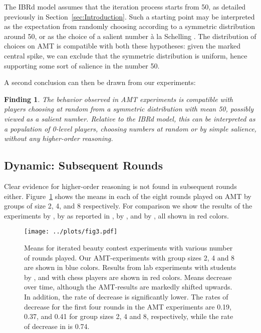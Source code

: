 \documentclass[12pt,review]{elsarticle}
\newtheorem{fdn}{Finding}
\begin{document}

The IBRd model assumes that the iteration process starts from 50,
as detailed previously in Section~\ref{sec:Introduction}. Such a
starting point may be interpreted as the expectation from randomly
choosing according to a symmetric distribution around 50, or as the
choice of a salient number \`{a} la Schelling \citep{sch60}. The
distribution of choices on AMT is compatible with both these hypotheses:
given the marked central spike, we can exclude that the symmetric
distribution is uniform, hence supporting some sort of salience in
the number 50. 

A second conclusion can then be drawn from our experiments: 

\begin{fdn}
The behavior observed in AMT experiments is compatible with players choosing at random from a symmetric distribution with mean 50, possibly viewed as a salient number. Relative to the IBRd model, this can be interpreted as a population of 0-level players, choosing numbers at random or by simple salience, without any higher-order reasoning.
\end{fdn}

\subsection{Dynamic: Subsequent Rounds\label{subsec:Dynamic:-Subsequent-Rounds}}
\noindent
Clear evidence for higher-order reasoning is not found in subsequent rounds either. Figure~\ref{fig:means} shows the means in each of the eight rounds played on AMT by groups of size 2, 4, and 8 respectively. For comparison we show the results of the experiments by \citet{Nagel95}, by \citet{Kamm2008unter} as reported in \cite{diekmann2009rational}, by \citet{weber2003learning}, and by \citet{buhren2010chess}, all shown in red colors.

\begin{figure}
\texttt{[image: ../plots/fig3.pdf]}
\caption{Means for iterated beauty contest experiments with various number of rounds played. Our AMT-experiments with group sizes 2, 4 and 8  are shown in blue colors. Results from lab experiments with students by \citet{Nagel95, Kamm2008unter, weber2003learning}, and with chess players \citet{buhren2010chess} are shown in red colors. Means decrease over time, although the AMT-results are markedly shifted upwards. In addition, the rate of decrease is significantly lower. The rates of decrease for the first four rounds in the AMT experiments are 0.19, 0.37, and 0.41 for group sizes 2, 4 and 8, respectively, while the rate of decrease in \citet{Nagel95} is 0.74.}
\label{fig:means}
\end{figure}
\end{document}
